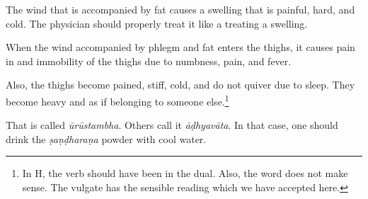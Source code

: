\begin{translation}
\begin{tt}
\begin{sloka}
        \end{sloka}



        \item[30]


        \begin{sloka}

            The wind
            that is accompanied by fat causes a swelling that is painful, hard, and cold. The
            physician should properly treat it like a treating a swelling.


        \end{sloka}



        \item[31]


        \begin{sloka}

            When the
            wind accompanied by phlegm and fat enters the thighs, it causes pain in and
            immobility of the thighs due to numbness, pain, and fever.


        \end{sloka}



        \item[32]


        \begin{sloka}

            Also, the
            thighs become pained, stiff, cold, and do not quiver due to sleep. They become
            heavy and as if belonging to someone else.\footnote{In H, the verb
                 should have been in the dual. Also, the word  does
                not make sense. The vulgate has the sensible reading  which we
                have accepted here.}


        \end{sloka}



        \item[33]


        \begin{sloka}

            That is
            called \textit{ūrūstambha}. Others call it \textit{āḍhyavāta}. In that case, one
            should drink the \textit{ṣaṇḍharaṇa} powder with cool water.


        \end{sloka}




\end{tt}
\end{translation}
